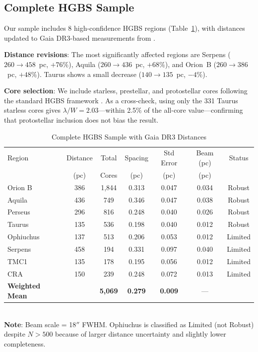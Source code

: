 \documentclass[twoside,twocolumn]{mnras}
\begin{document}
\subsection{Complete HGBS Sample}
\label{sec:sample}

Our sample includes 8 high-confidence HGBS regions (Table~\ref{tab:sample}), with
distances updated to Gaia DR3-based measurements from \citet{Zhang2023}.

\textbf{Distance revisions}: The most significantly affected regions are Serpens
($260 \to 458$~pc, $+76\%$), Aquila ($260 \to 436$~pc, $+68\%$), and Orion~B
($260 \to 386$~pc, $+48\%$). Taurus shows a small decrease ($140 \to 135$~pc, $-4\%$).

\textbf{Core selection}: We include starless, prestellar, and protostellar cores following the standard HGBS framework \citep{Konyves2015, Konyves2020}. As a cross-check, using only the 331 Taurus starless cores gives $\lambda/W = 2.03$---within 2.5\% of the all-core value---confirming that protostellar inclusion does not bias the result.

\begin{table}
\caption{Complete HGBS Sample with Gaia DR3 Distances}
\label{tab:sample}
\begin{tabular}{lcccccc}
\toprule
Region & Distance & Total & Spacing & Std Error & Beam (pc) & Status \\
       & (pc)   & Cores & (pc)   & (pc)      & (pc) & \\
\midrule
Orion B  & 386 & 1,844 & 0.313 & 0.047 & 0.034 & Robust \\
Aquila   & 436 & 749   & 0.346 & 0.047 & 0.038 & Robust \\
Perseus  & 296 & 816   & 0.248 & 0.040 & 0.026 & Robust \\
Taurus   & 135 & 536   & 0.198 & 0.040 & 0.012 & Robust \\
Ophiuchus& 137 & 513   & 0.206 & 0.053 & 0.012 & Limited \\
Serpens  & 458 & 194   & 0.331 & 0.097 & 0.040 & Limited \\
TMC1     & 135 & 178   & 0.195 & 0.056 & 0.012 & Limited \\
CRA      & 150 & 239   & 0.248 & 0.072 & 0.013 & Limited \\
\midrule
\textbf{Weighted Mean} &  & \textbf{5,069} & \textbf{0.279} & \textbf{0.009} & --- &  \\
\bottomrule
\end{tabular}
\\ \footnotesize \textbf{Note}: Beam scale = 18$''$ FWHM. Ophiuchus is classified as Limited (not Robust) despite $N>500$ because of larger distance uncertainty and slightly lower completeness.
\end{table}
\end{document}
